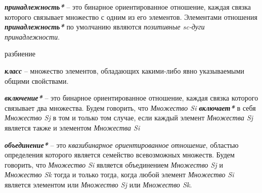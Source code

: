 \begin{SCn}
\end{SCn}

\textbf{\textit{принадлежность*}} – это бинарное ориентированное отношение, каждая связка которого связывает множество с одним из его элементов. Элементами отношения \textbf{\textit{принадлежность*}} по умолчанию являются \textit{позитивные sc-дуги принадлежности}.


\begin{SCn}
\begin{scnrelfromset}{разбиение}
\end{scnrelfromset}
\end{SCn}

\textbf{\textit{класс}} – множество элементов, обладающих какими-либо явно указываемыми общими свойствами.


\begin{SCn}
\end{SCn}

\textbf{\textit{включение*}} – это бинарное ориентированное отношение, каждая связка которого связывает два множества. Будем говорить, что \textit{Множество Si} \textbf{\textit{включает*}} в себя \textit{Множество Sj} в том и только том случае, если каждый элемент \textit{Множества Sj} является также и элементом \textit{Множества Si}

\begin{SCn}
\end{SCn}

\textbf{\textit{объединение*}} – это \textit{квазибинарное ориентированное отношение}, областью определения которого является семейство всевозможных множеств. Будем говорить, что \textit{Множество Si} является объединением \textit{Множество Sj} и \textit{Множество Sk} тогда и только тогда, когда любой элемент \textit{Множество Si} является элементом или \textit{Множество Sj} или \textit{Множество Sk}.

